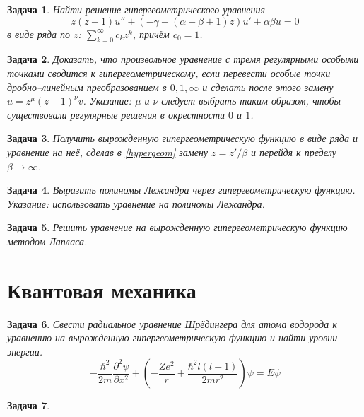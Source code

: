 \documentclass{article}
\newtheorem{problem}{Задача}
\begin{document}
\begin{problem}
    Найти решение гипергеометрического уравнения
    \begin{equation}
        \label{hypergeom}
        z(z-1)u'' + (-\gamma + (\alpha + \beta + 1)z)u' + \alpha \beta u = 0
    \end{equation}
    в виде ряда по $z$: $\sum_{k=0}^{\infty} c_k z^k$, причём $c_0 = 1$.
\end{problem}
\begin{problem}
    Доказать, что произвольное уравнение с тремя регулярными особыми точками
    сводится к гипергеометрическому, если перевести особые точки
    дробно--линейным преобразованием в $0,1, \infty$ и сделать после этого замену 
    $u = z^\mu (z-1)^\nu v$. \emph{Указание:} $\mu$ и $\nu$ следует выбрать таким образом,
    чтобы существовали регулярные решения в окрестности $0$ и $1$.
\end{problem}    
\begin{problem}
    Получить вырожденную гипергеометрическую функцию в виде ряда 
    и уравнение на неё, сделав в    
    \eqref{hypergeom} замену $z = z'/\beta$ и перейдя к пределу $\beta \to \infty$.
\end{problem}
\begin{problem}
    Выразить полиномы Лежандра через гипергеометрическую функцию. \emph{Указание}: использовать
    уравнение на полиномы Лежандра.
\end{problem}
\begin{problem}
    Решить уравнение на вырожденную гипергеометрическую функцию методом Лапласа.
\end{problem}
\section{Квантовая механика}
\begin{problem}
    Свести радиальное уравнение Шрёдингера для атома водорода к уравнению на 
    вырожденную гипергеометрическую функцию
    и найти уровни энергии.
    \begin{equation}
        -\frac{\hbar^2}{2m}\frac{\partial^2 \psi}{\partial x^2} + 
            \left(-\frac{Ze^2}{r} + \frac{\hbar^2l(l+1)}{2mr^2}\right)\psi = E\psi
    \end{equation}
\end{problem}
\begin{problem}
    
\end{problem}
\end{document}
